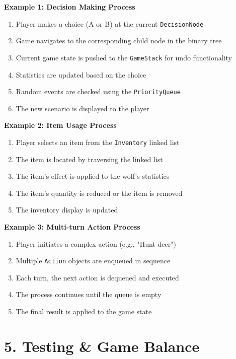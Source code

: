 \documentclass[12pt,a4paper]{article}
\begin{document}
\textbf{Example 1: Decision Making Process}
\begin{enumerate}
	\item Player makes a choice (A or B) at the current \texttt{DecisionNode}
	\item Game navigates to the corresponding child node in the binary tree
	\item Current game state is pushed to the \texttt{GameStack} for undo functionality
	\item Statistics are updated based on the choice
	\item Random events are checked using the \texttt{PriorityQueue}
	\item The new scenario is displayed to the player
\end{enumerate}

\textbf{Example 2: Item Usage Process}
\begin{enumerate}
	\item Player selects an item from the \texttt{Inventory} linked list
	\item The item is located by traversing the linked list
	\item The item's effect is applied to the wolf's statistics
	\item The item's quantity is reduced or the item is removed
	\item The inventory display is updated
\end{enumerate}

\textbf{Example 3: Multi-turn Action Process}
\begin{enumerate}
	\item Player initiates a complex action (e.g., "Hunt deer")
	\item Multiple \texttt{Action} objects are enqueued in sequence
	\item Each turn, the next action is dequeued and executed
	\item The process continues until the queue is empty
	\item The final result is applied to the game state
\end{enumerate}

\section[5. Testing and Game Balance]{5. Testing \& Game Balance}
\end{document}
